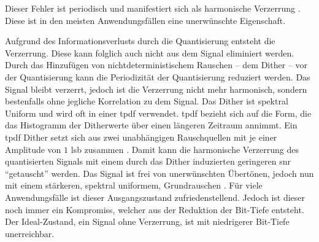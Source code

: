 Dieser Fehler ist periodisch und manifestiert sich als harmonische Verzerrung \autocites{dither}{noise-shaping}.
Diese ist in den meisten Anwendungsfällen eine unerwünschte Eigenschaft.

Aufgrund des Informationsverlusts durch die Quantisierung entsteht die Verzerrung.
Diese kann folglich auch nicht aus dem Signal eliminiert werden.
Durch das Hinzufügen von nichtdeterministischem Rauschen -- dem Dither -- vor der Quantisierung kann die Periodizität der Quantisierung reduziert werden.
Das Signal bleibt verzerrt, jedoch ist die Verzerrung nicht mehr harmonisch, sondern bestenfalls ohne jegliche Korrelation zu dem Signal.
Das Dither ist spektral Uniform und wird oft in einer \gls{tpdf} verwendet.
\gls{tpdf} bezieht sich auf die Form, die das Histogramm der Ditherwerte über einen längeren Zeitraum annimmt.
Ein \gls{tpdf} Dither setzt sich aus zwei unabhängigen Rauschquellen mit je einer Amplitude von $1$ \gls{lsb} zusammen \autocites{dither}[S. 23ff, S. 30ff, Figure 2-10b]{dsp-guide}.
Damit kann die harmonische Verzerrung des quantisierten Signals mit einem durch das Dither induzierten geringeren \gls{snr} \enquote{getauscht} werden.
Das Signal ist frei von unerwünschten Übertönen, jedoch nun mit einem stärkeren, spektral uniformem, Grundrauschen \autocites{dither}{noise-shaping}.
Für viele Anwendungsfälle ist dieser Ausgangszustand zufriedenstellend.
Jedoch ist dieser noch immer ein Kompromiss, welcher aus der Reduktion der Bit-Tiefe entsteht.
Der Ideal-Zustand, ein Signal ohne Verzerrung, ist mit niedrigerer Bit-Tiefe unerreichbar.


